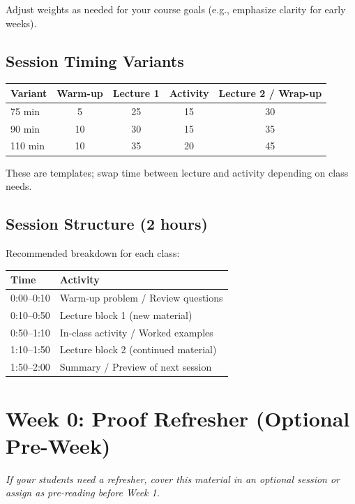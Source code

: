 \documentclass[11pt]{article}
\begin{document}
Adjust weights as needed for your course goals (e.g., emphasize clarity for early weeks).

\subsection{Session Timing Variants}
\begin{center}
\begin{tabular}{lcccc}
\toprule
\textbf{Variant} & \textbf{Warm-up} & \textbf{Lecture 1} & \textbf{Activity} & \textbf{Lecture 2 / Wrap-up} \\
\midrule
75 min  & 5  & 25 & 15 & 30 \\
90 min  & 10 & 30 & 15 & 35 \\
110 min & 10 & 35 & 20 & 45 \\
\bottomrule
\end{tabular}
\end{center}
These are templates; swap time between lecture and activity depending on class needs.

\subsection{Session Structure (2 hours)}
Recommended breakdown for each class:
\begin{center}
\begin{tabular}{ll}
\toprule
\textbf{Time} & \textbf{Activity} \\
\midrule
0:00--0:10 & Warm-up problem / Review questions \\
0:10--0:50 & Lecture block 1 (new material) \\
0:50--1:10 & In-class activity / Worked examples \\
1:10--1:50 & Lecture block 2 (continued material) \\
1:50--2:00 & Summary / Preview of next session \\
\bottomrule
\end{tabular}
\end{center}

\newpage
\section{Week 0: Proof Refresher (Optional Pre-Week)}

\textit{If your students need a refresher, cover this material in an optional session or assign as pre-reading before Week 1.}
\end{document}
